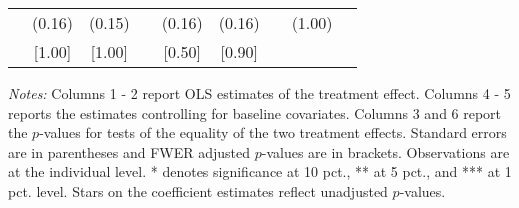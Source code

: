 \begin{table}[htbp]
{\begin{threeparttable}
\begin{tabular}{l*{8}{c}}
          &   (0.16)&   (0.15)&         &   (0.16)&   (0.16)&         &   (1.00)&         \\
          &   [1.00]&   [1.00]&         &   [0.50]&   [0.90]&         &         &         \\
\bottomrule \end{tabular} \begin{tablenotes}[flushleft] \footnotesize \item \emph{Notes:} Columns 1 - 2 report OLS estimates of the treatment effect. Columns 4 - 5 reports the estimates controlling for baseline covariates. Columns 3 and 6 report the \(p\)-values for tests of the equality of the two treatment effects. Standard errors are in parentheses and FWER adjusted \(p\)-values are in brackets. Observations are at the individual level. * denotes significance at 10 pct., ** at 5 pct., and *** at 1 pct. level. Stars on the coefficient estimates reflect unadjusted \(p\)-values. \end{tablenotes} \end{threeparttable} } \end{table}

